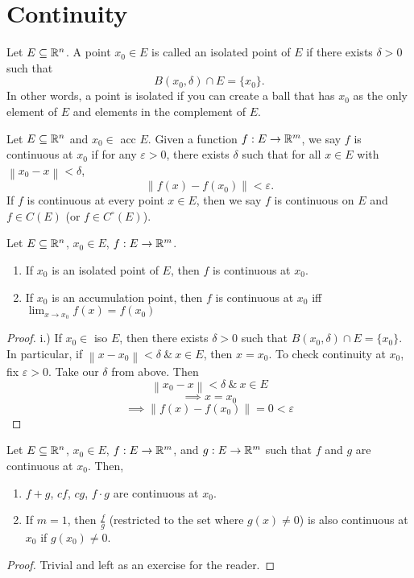 \documentclass[11pt]{article}
\newcommand{\norm}[1]{\left\lVert #1 \right\rVert}
\newcommand{\ra}{\rightarrow}
\begin{document}
\section{Continuity}
\begin{definition}
    Let $E \subseteq \mathbb{R}^n$. A point $x_0 \in E$ is called an isolated point of $E$ if there exists $\delta >0$ such that 
    \[B(x_0,\delta) \cap E = \{x_0\}.\]
    In other words, a point is isolated if you can create a ball that has $x_0$ as the only element of $E$ and elements in the complement of $E$.
\end{definition}
\begin{definition}
    Let $E \subseteq \mathbb{R}^n$ and $x_0 \in$ acc $E$. Given a function $f: E \ra \R^m$, we say $f$ is continuous at $x_0$ if for any $\varepsilon > 0$, there exists $\delta$ such that for all $x \in E$ with $\norm{x_0 - x} < \delta$, 
    \[\norm{f(x) - f(x_0)} < \varepsilon.\]
    If $f$ is continuous at every point $x \in E$, then we say $f$ is continuous on $E$ and $f \in C(E)$ (or $f \in C^\circ(E)$). 
\end{definition}

\begin{theorem}
    Let $E \subseteq \mathbb{R}^n$, $x_0 \in E$, $f: E \ra \R^m$. 
    \begin{enumerate} [label = \roman*.)]
        \item If $x_0$ is an isolated point of $E$, then $f$ is continuous at $x_0$. 
        \item If $x_0$ is an accumulation point, then $f$ is continuous at $x_0$ iff $\displaystyle{\lim_{x \ra x_0} f(x) = f(x_0)}$
    \end{enumerate}
    \begin{proof}
        i.) If $x_0 \in$ iso $E$, then there exists $\delta > 0$ such that $B(x_0, \delta) \cap E = \{x_0\}$. In particular, if $\norm{x - x_0} < \delta \ \& \ x \in E$, then $x = x_0$. To check continuity at $x_0$, fix $\varepsilon > 0$. Take our $\delta$ from above. Then \[\norm{x_0 - x} < \delta \ \& \ x \in E\]
        \[\implies x = x_0\]
        \[\implies \norm{f(x) - f(x_0)} = 0 < \varepsilon\]
    \end{proof}
\end{theorem}

\begin{theorem}
    Let $E \subseteq \mathbb{R}^n$, $x_0 \in E$, $f: E \ra \R^m$, and $g: E \ra \R^m$ such that $f$ and $g$ are continuous at $x_0$. Then,
    \begin{enumerate} [label = \roman*.)]
        \item $f + g$, $cf$, $cg$, $f \cdot g$ are continuous at $x_0$. 
        \item If $m = 1$, then $\frac{f}{g}$ (restricted to the set where $g(x) \neq 0$) is also continuous at $x_0$ if $g(x_0) \neq 0$. 
    \end{enumerate}
    \begin{proof}
        Trivial and left as an exercise for the reader. 
    \end{proof}
\end{theorem}
\end{document}
